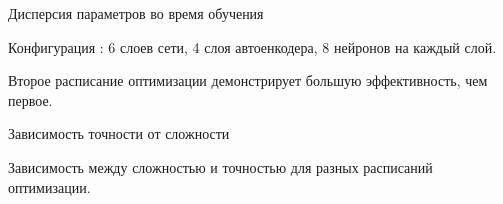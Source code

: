 \documentclass[9pt,pdf,hyperref={unicode}]{beamer}
\begin{document}
\begin{frame}{Дисперсия параметров во время обучения}
\begin{center}
Конфигурация : 6 слоев сети, 4 слоя автоенкодера, 8 нейронов на каждый слой.
\begin{figure}[h!]
\label{fig:opt schedule 2}
\end{figure}
Второе расписание оптимизации демонстрирует большую эффективность, чем первое.
\end{center}
\end{frame}
\begin{frame}{Зависимость точности от сложности}
\begin{center}
\begin{figure}[h!]

\label{fig:opt schedule 2}
\end{figure}
Зависимость между сложностью и точностью для разных расписаний оптимизации.
\end{center}
\end{frame}
\end{document}

